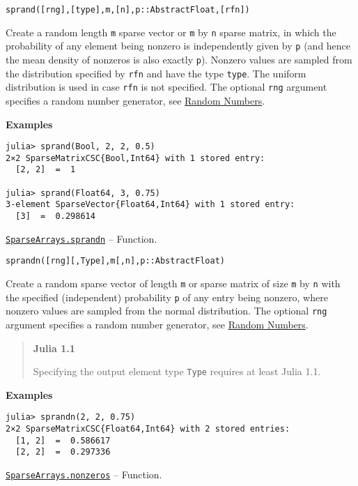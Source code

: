 \begin{adjustwidth}{2em}{0pt}


\begin{verbatim}
sprand([rng],[type],m,[n],p::AbstractFloat,[rfn])
\end{verbatim}

Create a random length \texttt{m} sparse vector or \texttt{m} by \texttt{n} sparse matrix, in which the probability of any element being nonzero is independently given by \texttt{p} (and hence the mean density of nonzeros is also exactly \texttt{p}). Nonzero values are sampled from the distribution specified by \texttt{rfn} and have the type \texttt{type}. The uniform distribution is used in case \texttt{rfn} is not specified. The optional \texttt{rng} argument specifies a random number generator, see \href{@ref}{Random Numbers}.

\textbf{Examples}


\begin{verbatim}
julia> sprand(Bool, 2, 2, 0.5)
2×2 SparseMatrixCSC{Bool,Int64} with 1 stored entry:
  [2, 2]  =  1

julia> sprand(Float64, 3, 0.75)
3-element SparseVector{Float64,Int64} with 1 stored entry:
  [3]  =  0.298614
\end{verbatim}



\end{adjustwidth}
\hypertarget{3588082437273281277}{} 
\hyperlink{3588082437273281277}{\texttt{SparseArrays.sprandn}}  -- {Function.}

\begin{adjustwidth}{2em}{0pt}


\begin{verbatim}
sprandn([rng][,Type],m[,n],p::AbstractFloat)
\end{verbatim}

Create a random sparse vector of length \texttt{m} or sparse matrix of size \texttt{m} by \texttt{n} with the specified (independent) probability \texttt{p} of any entry being nonzero, where nonzero values are sampled from the normal distribution. The optional \texttt{rng} argument specifies a random number generator, see \href{@ref}{Random Numbers}.

\begin{quote}
\textbf{Julia 1.1}

Specifying the output element type \texttt{Type} requires at least Julia 1.1.

\end{quote}
\textbf{Examples}


\begin{verbatim}
julia> sprandn(2, 2, 0.75)
2×2 SparseMatrixCSC{Float64,Int64} with 2 stored entries:
  [1, 2]  =  0.586617
  [2, 2]  =  0.297336
\end{verbatim}



\end{adjustwidth}
\hypertarget{2553509978651134823}{} 
\hyperlink{2553509978651134823}{\texttt{SparseArrays.nonzeros}}  -- {Function.}

